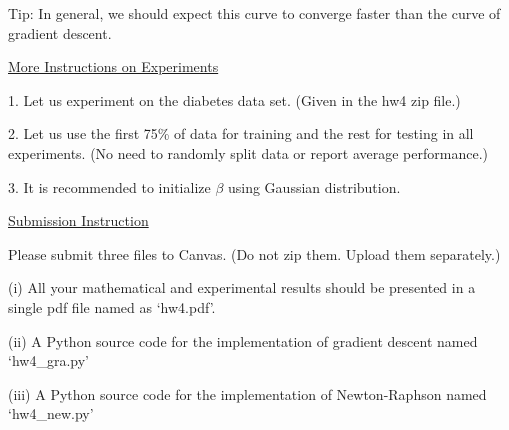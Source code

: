\documentclass{llncs}
\begin{document}
Tip: In general, we should expect this curve to 
converge faster than the curve of gradient descent. 

\vfill 
 
\underline{More Instructions on Experiments}

1. Let us experiment on the diabetes data set. (Given 
in the hw4 zip file.)

2. Let us use the first 75\% of data for training 
and the rest for testing in all experiments. 
(No need to randomly split data or report average 
performance.) 

3. It is recommended to initialize $\beta$ using 
Gaussian distribution. 

\underline{Submission Instruction}

Please submit three files to Canvas. (Do not 
zip them. Upload them separately.) 

(i) All your mathematical and experimental results 
should be presented in a single pdf file named 
as `hw4.pdf'. 

(ii) A Python source code for the 
implementation of gradient descent named `hw4\_gra.py'

(iii) A Python source code for the 
implementation of Newton-Raphson named `hw4\_new.py'
\end{document}
